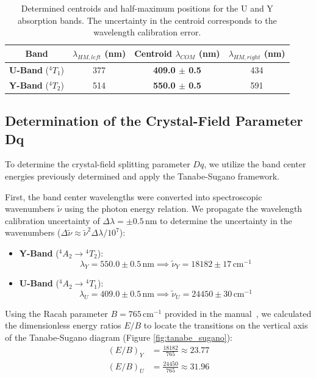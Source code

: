 \documentclass[a4paper]{article}
\begin{document}
\begin{table}[H]
    \centering
    \begin{tabular}{c|ccc}
    \hline
    \textbf{Band} & \textbf{$\lambda_{HM, left}$ (nm)} & \textbf{Centroid $\lambda_{COM}$ (nm)} & \textbf{$\lambda_{HM, right}$ (nm)} \\ \hline
    \textbf{U-Band} (${}^4T_1$) & 377 & \textbf{409.0 $\pm$ 0.5} & 434 \\
    \textbf{Y-Band} (${}^4T_2$) & 514 & \textbf{550.0 $\pm$ 0.5} & 591 \\ \hline
    \end{tabular}
    \caption{Determined centroids and half-maximum positions for the U and Y absorption bands. The uncertainty in the centroid corresponds to the wavelength calibration error.}
    \label{tab:bandcenters}
\end{table}


\subsection{Determination of the Crystal-Field Parameter Dq}
To determine the crystal-field splitting parameter $Dq$, we utilize the band center energies previously determined and apply the Tanabe-Sugano framework.

First, the band center wavelengths were converted into spectroscopic wavenumbers $\tilde{\nu}$ using the photon energy relation. We propagate the wavelength calibration uncertainty of $\Delta\lambda = \pm 0.5\,\mathrm{nm}$ to determine the uncertainty in the wavenumbers ($\Delta\tilde{\nu} \approx \tilde{\nu}^2 \Delta\lambda / 10^7$):

\begin{itemize}
    \item \textbf{Y-Band} (${}^4A_2 \rightarrow {}^4T_2$): 
    \[ \lambda_Y = 550.0 \pm 0.5\,\mathrm{nm} \implies \tilde{\nu}_Y = 18182 \pm 17\,\mathrm{cm}^{-1} \]
    \item \textbf{U-Band} (${}^4A_2 \rightarrow {}^4T_1$): 
    \[ \lambda_U = 409.0 \pm 0.5\,\mathrm{nm} \implies \tilde{\nu}_U = 24450 \pm 30\,\mathrm{cm}^{-1} \]
\end{itemize}

Using the Racah parameter $B = 765\,\mathrm{cm}^{-1}$ provided in the manual~\cite{ISOAnleitung}, we calculated the dimensionless energy ratios $E/B$ to locate the transitions on the vertical axis of the Tanabe-Sugano diagram (Figure \ref{fig:tanabe_sugano}):
\begin{align*}
    (E/B)_Y &= \frac{18182}{765} \approx 23.77 \\
    (E/B)_U &= \frac{24450}{765} \approx 31.96
\end{align*}
\end{document}
